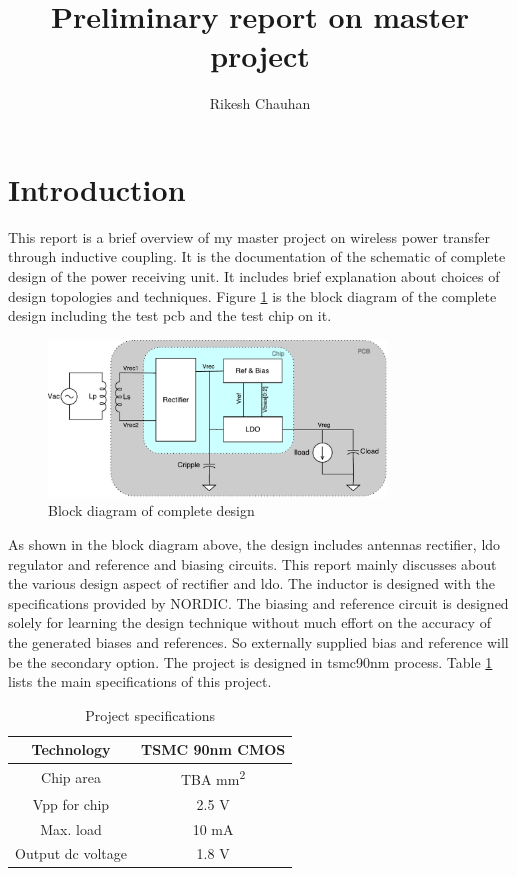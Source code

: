 \documentclass[12pt,a4paper,UKenglish]{article}
\title{Preliminary report on master project}
\author{Rikesh Chauhan}
\date{}
\begin{document}
\maketitle

\section{Introduction}
This report is a brief overview of my master project on wireless power transfer through inductive coupling. It is the documentation of the schematic of complete design of the power receiving unit. It includes brief explanation about choices of design topologies and techniques. Figure \ref{fig:blockd} is the block diagram of the complete design including the test \acrshort{pcb} and the test chip on it.

\begin{figure}[htbp] %
   \centering
   \includegraphics[width=0.8\textwidth]{img/block_diagram.pdf}
   \caption{Block diagram of complete design}
   \label{fig:blockd}
\end{figure}

As shown in the block diagram above, the design includes antennas rectifier, \acrshort{ldo} regulator and reference and biasing circuits. This report mainly discusses about the various design aspect of rectifier and \acrshort{ldo}. The inductor is designed with the specifications provided by NORDIC. The biasing and reference circuit is designed solely for learning the design technique without much effort on the accuracy of the generated biases and references. So externally supplied bias and reference will be the secondary option. The project is designed in tsmc90nm process. Table \ref{proj_spec} lists the main specifications of this project.  \\ 

\begin{table}[!htbp]
\caption{Project specifications}
\begin{center}
\begin{tabular}{c|c}
\hline \hline
Technology & TSMC 90nm CMOS \\ \hline
Chip area & TBA mm\textsuperscript{2} \\ \hline
Vpp for chip & 2.5 V \\ \hline
Max. load & 10 mA \\ \hline
Output dc voltage & 1.8 V \\ 
\hline \hline
\end{tabular}
\end{center}
\label{proj_spec}
\end{table}
\end{document}
